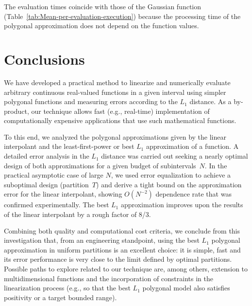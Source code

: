 \documentclass[a4paper,english]{IEEEtran}
\begin{document}
The evaluation times coincide with those of the Gaussian function
(Table~\ref{tab:Mean-per-evaluation-execution}) because the processing
time of the polygonal approximation does not depend on the function
values.

\section{Conclusions\label{sec:Conclusions}}

We have developed a practical method to linearize and numerically
evaluate arbitrary continuous real-valued functions in a given interval
using simpler polygonal functions and measuring errors according to
the ${L_{1}}$ distance. As a by-product, our technique allows fast
(e.g., real-time) implementation of computationally expensive applications
that use such mathematical functions. 

To this end, we analyzed the polygonal approximations given by the
linear interpolant and the least-first-power or best ${L_{1}}$ approximation
of a function. A detailed error analysis in the ${L_{1}}$ distance
was carried out seeking a nearly optimal design of both approximations
for a given budget of subintervals~$N$. In the practical asymptotic
case of large $N$, we used error equalization to achieve a suboptimal
design (partition~${T}$) and derive a tight bound on the approximation
error for the linear interpolant, showing $O(N^{-2})$ dependence
rate that was confirmed experimentally. The best ${L_{1}}$ approximation
improves upon the results of the linear interpolant by a rough factor
of 8/3. 

Combining both quality and computational cost criteria, we conclude
from this investigation that, from an engineering standpoint, using
the best ${L_{1}}$ polygonal approximation in uniform partitions is
an excellent choice: it is simple, fast and its error performance
is very close to the limit defined by optimal partitions. Possible
paths to explore related to our technique are, among others, extension
to multidimensional functions and the incorporation of constraints
in the linearization process (e.g., so that the best ${L_{1}}$ polygonal
model also satisfies positivity or a target bounded range). 
\end{document}
